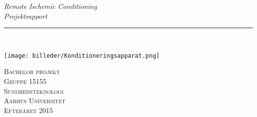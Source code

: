 \thispagestyle{empty}
\begin{flushright}
\vspace{3cm}

\phantom{hul}

\phantom{hul}

\phantom{hul}

\textsl{\Huge Remote Ischemic Conditioning} \\ \vspace{1cm}
\textsl{\Huge Projektrapport} \\ \vspace{1cm}

\rule{\textwidth}{3mm} \\ \vspace{1.5cm}
\vspace{1cm}

\texttt{[image: billeder/Konditioneringsapparat.png]}

\vspace{2cm} 
\textsc{\Large Bachelor projekt \\
Gruppe 15155 \\
Sundhedsteknologi \\
Aarhus Universitet \\
Efteråret 2015 \\}
\end{flushright}

